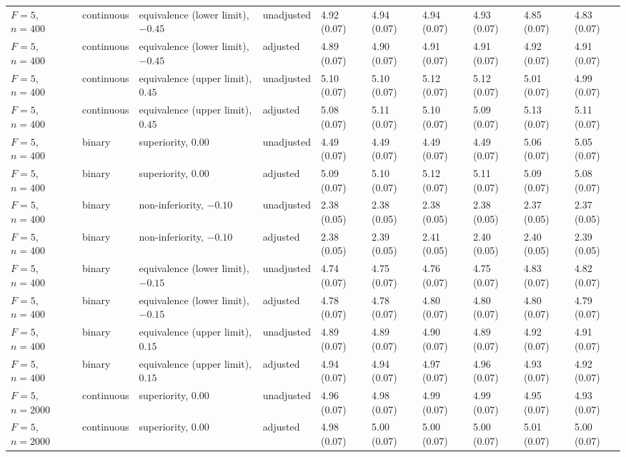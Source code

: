 \begin{landscape}
\begin{singlespace}
\begin{longtable}{@{}llllllllll@{}}
$F=5$, $n=400$ & continuous & equivalence (lower limit), $-0.45$ & unadjusted & 4.92 (0.07) & 4.94 (0.07) & 4.94 (0.07) & 4.93 (0.07) & 4.85 (0.07) & 4.83 (0.07)\\
$F=5$, $n=400$ & continuous & equivalence (lower limit), $-0.45$ & adjusted & 4.89 (0.07) & 4.90 (0.07) & 4.91 (0.07) & 4.91 (0.07) & 4.92 (0.07) & 4.91 (0.07)\\
$F=5$, $n=400$ & continuous & equivalence (upper limit), $0.45$ & unadjusted & 5.10 (0.07) & 5.10 (0.07) & 5.12 (0.07) & 5.12 (0.07) & 5.01 (0.07) & 4.99 (0.07)\\
$F=5$, $n=400$ & continuous & equivalence (upper limit), $0.45$ & adjusted & 5.08 (0.07) & 5.11 (0.07) & 5.10 (0.07) & 5.09 (0.07) & 5.13 (0.07) & 5.11 (0.07)\\
$F=5$, $n=400$ & binary & superiority, $0.00$ & unadjusted & 4.49 (0.07) & 4.49 (0.07) & 4.49 (0.07) & 4.49 (0.07) & 5.06 (0.07) & 5.05 (0.07)\\
$F=5$, $n=400$ & binary & superiority, $0.00$ & adjusted & 5.09 (0.07) & 5.10 (0.07) & 5.12 (0.07) & 5.11 (0.07) & 5.09 (0.07) & 5.08 (0.07)\\
$F=5$, $n=400$ & binary & non-inferiority, $-0.10$ & unadjusted & 2.38 (0.05) & 2.38 (0.05) & 2.38 (0.05) & 2.38 (0.05) & 2.37 (0.05) & 2.37 (0.05)\\
$F=5$, $n=400$ & binary & non-inferiority, $-0.10$ & adjusted & 2.38 (0.05) & 2.39 (0.05) & 2.41 (0.05) & 2.40 (0.05) & 2.40 (0.05) & 2.39 (0.05)\\
$F=5$, $n=400$ & binary & equivalence (lower limit), $-0.15$ & unadjusted & 4.74 (0.07) & 4.75 (0.07) & 4.76 (0.07) & 4.75 (0.07) & 4.83 (0.07) & 4.82 (0.07)\\
$F=5$, $n=400$ & binary & equivalence (lower limit), $-0.15$ & adjusted & 4.78 (0.07) & 4.78 (0.07) & 4.80 (0.07) & 4.80 (0.07) & 4.80 (0.07) & 4.79 (0.07)\\
$F=5$, $n=400$ & binary & equivalence (upper limit), $0.15$ & unadjusted & 4.89 (0.07) & 4.89 (0.07) & 4.90 (0.07) & 4.89 (0.07) & 4.92 (0.07) & 4.91 (0.07)\\
$F=5$, $n=400$ & binary & equivalence (upper limit), $0.15$ & adjusted & 4.94 (0.07) & 4.94 (0.07) & 4.97 (0.07) & 4.96 (0.07) & 4.93 (0.07) & 4.92 (0.07)\\
$F=5$, $n=2000$ & continuous & superiority, $0.00$ & unadjusted & 4.96 (0.07) & 4.98 (0.07) & 4.99 (0.07) & 4.99 (0.07) & 4.95 (0.07) & 4.93 (0.07)\\
$F=5$, $n=2000$ & continuous & superiority, $0.00$ & adjusted & 4.98 (0.07) & 5.00 (0.07) & 5.00 (0.07) & 5.00 (0.07) & 5.01 (0.07) & 5.00 (0.07)\\

\end{longtable}
\end{singlespace}
\end{landscape}
